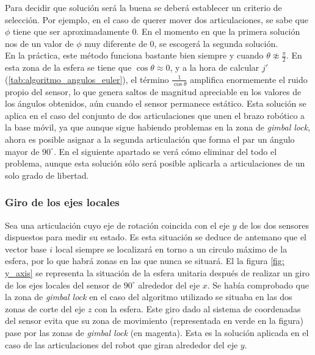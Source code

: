 \documentclass[12pt, a4paper]{report}
\begin{document}
Para decidir que solución será la buena se deberá establecer un criterio de selección. Por ejemplo, en el caso de querer mover dos articulaciones, se sabe que $\phi$ tiene que ser aproximadamente $0$. En el momento en que la primera solución nos de un valor de $\phi$ muy diferente de $0$, se escogerá la segunda solución.\\

En la práctica, este método funciona bastante bien siempre y cuando $\theta \not\approx \frac{\pi}{2}$. En esta zona de la esfera se tiene que $\cos\theta \approx 0$, y a la hora de calcular $ j'$ (\ref{tab:algoritmo_angulos_euler}), el término $\frac{1}{\cos\theta}$ amplifica enormemente el ruido propio del sensor, lo que genera saltos de magnitud apreciable en los valores de los ángulos obtenidos, aún cuando el sensor permanece estático. Esta solución se aplica en el caso del conjunto de dos articulaciones que unen el brazo robótico a la base móvil, ya que aunque sigue habiendo problemas en la zona de \textit{gimbal lock}, ahora es posible asignar a la segunda articulación que forma el par un ángulo mayor de $90^\circ$. En el siguiente apartado se verá cómo eliminar del todo el problema, aunque esta solución sólo será posible aplicarla a articulaciones de un solo grado de libertad. 

\subsubsection{Giro de los ejes locales}

Sea una articulación cuyo eje de rotación coincida con el eje $y$ de los dos sensores dispuestos para medir su estado. Es esta situación se deduce de antemano que el vector base $i$ local siempre se localizará en torno a un circulo máximo de la esfera, por lo que habrá zonas en las que nunca se situará. El la figura \ref{fig: y_axis} se representa la situación de la esfera unitaria después de realizar un giro de los ejes locales del sensor de $90^\circ$ alrededor del eje $x$. Se había comprobado que la zona de \textit{gimbal lock} en el caso del algoritmo utilizado se situaba en las dos zonas de corte del eje $z$ con la esfera. Este giro dado al sistema de coordenadas del sensor evita que su zona de movimiento (representada en verde en la figura) pase por las zonas de \textit{gimbal lock} (en magenta). Esta es la solución aplicada en el caso de las articulaciones del robot que giran alrededor del eje $y$. \\ 
\end{document}
